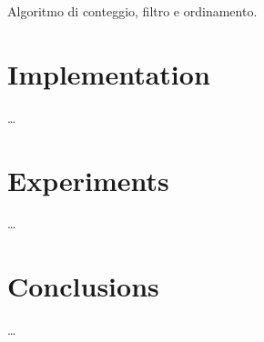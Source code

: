 \documentclass{acm_proc_article-sp-sigmod09}
\begin{document}
Algoritmo di conteggio, filtro e ordinamento.

\section{Implementation}

\dots

\section{Experiments}
\dots

\section{Conclusions}
\dots

%

\end{document}
